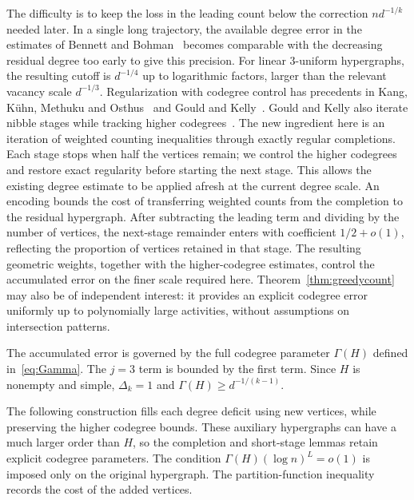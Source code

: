 \documentclass[11pt,reqno]{amsart}
\numberwithin{equation}{section}
\theoremstyle{plain}
\theoremstyle{definition}
\begin{document}
The difficulty is to keep the loss in the leading count below the correction $nd^{-1/k}$ needed later.
In a single long trajectory, the available degree error in the estimates of Bennett and Bohman~\cite{BB} becomes comparable with the decreasing residual degree too early to give this precision.
For linear $3$-uniform hypergraphs, the resulting cutoff is $d^{-1/4}$ up to logarithmic factors, larger than the relevant vacancy scale $d^{-1/3}$.
Regularization with codegree control has precedents in Kang, K\"uhn, Methuku and Osthus~\cite[Lemma~8.1]{KKMO} and Gould and Kelly~\cite[Lemma~4.1]{GK}.
Gould and Kelly also iterate nibble stages while tracking higher codegrees~\cite[Sections~7--8]{GK}.
The new ingredient here is an iteration of weighted counting inequalities through exactly regular completions.
Each stage stops when half the vertices remain; we control the higher codegrees and restore exact regularity before starting the next stage.
This allows the existing degree estimate to be applied afresh at the current degree scale.
An encoding bounds the cost of transferring weighted counts from the completion to the residual hypergraph.
After subtracting the leading term and dividing by the number of vertices, the next-stage remainder enters with coefficient $1/2+o(1)$, reflecting the proportion of vertices retained in that stage.
The resulting geometric weights, together with the higher-codegree estimates, control the accumulated error on the finer scale required here.
Theorem~\ref{thm:greedycount} may also be of independent interest: it provides an explicit codegree error uniformly up to polynomially large activities, without assumptions on intersection patterns.

The accumulated error is governed by the full codegree parameter $\Gamma(H)$ defined in~\eqref{eq:Gamma}. The $j=3$ term is bounded by the first term. Since $H$ is nonempty and simple, $\Delta_k=1$ and $\Gamma(H)\ge d^{-1/(k-1)}$.

The following construction fills each degree deficit using new vertices, while preserving the higher codegree bounds.
These auxiliary hypergraphs can have a much larger order than $H$, so the completion and short-stage lemmas retain explicit codegree parameters.
The condition $\Gamma(H)(\log n)^L=o(1)$ is imposed only on the original hypergraph.
The partition-function inequality records the cost of the added vertices.
\end{document}
